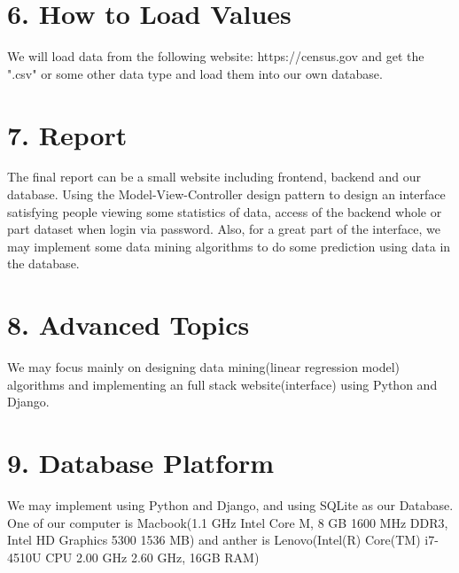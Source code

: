 \documentclass{article}
\begin{document}
\section*{6. How to Load Values}
We will load data from the following website: https://census.gov and get the ".csv" or some other data type and load them into our own database. 

\section*{7. Report}
The final report can be a small website including frontend, backend and our database. Using the Model-View-Controller design pattern to design an interface satisfying people viewing some statistics of data, access of the backend whole or part dataset when login via password. Also, for a great part of the interface, we may implement some data mining algorithms to do some prediction using data in the database.

\section*{8. Advanced Topics}
We may focus mainly on designing data mining(linear regression model) algorithms and implementing an full stack website(interface) using Python and Django. 

\section*{9. Database Platform}
We may implement using Python and Django, and using SQLite as our Database. One of our computer is Macbook(1.1 GHz Intel Core M, 8 GB 1600 MHz DDR3, Intel HD Graphics 5300 1536 MB) and anther is Lenovo(Intel(R) Core(TM) i7-4510U CPU 2.00 GHz 2.60 GHz, 16GB RAM)
\end{document}
